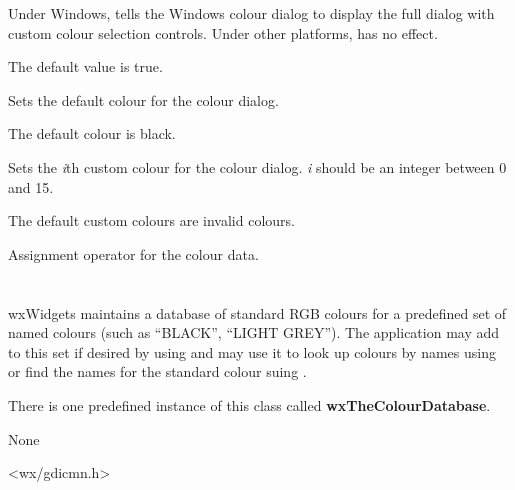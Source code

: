 
Under Windows, tells the Windows colour dialog to display the full dialog
with custom colour selection controls. Under other platforms, has no effect.

The default value is true.


\label{wxcolourdatasetcolour}


Sets the default colour for the colour dialog.

The default colour is black.


\label{wxcolourdatasetcustomcolour}


Sets the {\it i}th custom colour for the colour dialog. {\it i} should
be an integer between 0 and 15.

The default custom colours are invalid colours.


\label{wxcolourdataassign}


Assignment operator for the colour data.




\section{}\label{wxcolourdatabase}

wxWidgets maintains a database of standard RGB colours for a predefined
set of named colours (such as ``BLACK'', ``LIGHT GREY''). The
application may add to this set if desired by using
 and may use it to look up
colours by names using  or find the names
for the standard colour suing .

There is one predefined instance of this class called
{\bf wxTheColourDatabase}.


None


<wx/gdicmn.h>

